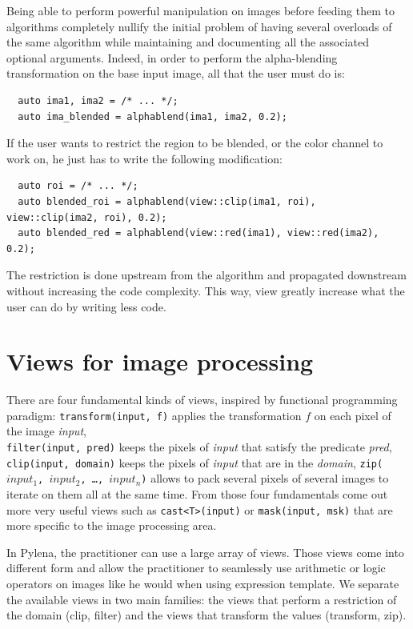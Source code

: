 Being able to perform powerful manipulation on images before feeding them to algorithms completely nullify the initial
problem of having several overloads of the same algorithm while maintaining and documenting all the associated optional
arguments. Indeed, in order to perform the alpha-blending transformation on the base input image, all that the user must
do is:
\begin{verbatim}
  auto ima1, ima2 = /* ... */;
  auto ima_blended = alphablend(ima1, ima2, 0.2);
\end{verbatim}
If the user wants to restrict the region to be blended, or the color channel to work on, he just has to write the
following modification:
\begin{verbatim}
  auto roi = /* ... */;
  auto blended_roi = alphablend(view::clip(ima1, roi), view::clip(ima2, roi), 0.2);
  auto blended_red = alphablend(view::red(ima1), view::red(ima2), 0.2);
\end{verbatim}
The restriction is done upstream from the algorithm and propagated downstream without increasing the code complexity.
This way, view greatly increase what the user can do by writing less code.

\section{Views for image processing}
\label{sec:viws_for_ip}

There are four fundamental kinds of views, inspired by functional programming paradigm: \texttt{transform(input, f)}
applies the transformation \(f\) on each pixel of the image \emph{input},\\
\texttt{filter(input, pred)} keeps the pixels of \emph{input} that satisfy the predicate \emph{pred},
\texttt{clip(input, domain)} keeps the pixels of \emph{input} that are in the \emph{domain}, \texttt{zip(\(input_1\),
  \(input_2\), \ldots, \(input_n\))} allows to pack several pixels of several images to iterate on them all at the same
time. From those four fundamentals come out more very useful views such as \texttt{cast<T>(input)} or
\texttt{mask(input, msk)} that are more specific to the image processing area.

In Pylena, the practitioner can use a large array of views. Those views come into different form and allow the
practitioner to seamlessly use arithmetic or logic operators on images like he would when using expression template. We
separate the available views in two main families: the views that perform a restriction of the domain (clip, filter) and
the views that transform the values (transform, zip).

